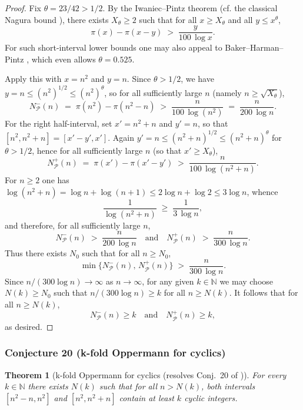 \documentclass[12pt]{article}
\newtheorem{theorem}{Theorem}
\theoremstyle{remark}
\begin{document}
\begin{proof}
Fix $\theta=23/42>1/2$. By the Iwaniec--Pintz theorem (cf. the classical Nagura bound \cite{Nagura1952}), there exists $X_\theta\ge 2$ such that for all $x\ge X_\theta$ and all $y\le x^{\theta}$,
\[
\pi(x)-\pi(x-y)\;>\;\frac{y}{100\,\log x}.
\]
For such short-interval lower bounds one may also appeal to Baker--Harman--Pintz \cite{BHP2001}, which even allows $\theta=0.525$.

Apply this with $x=n^2$ and $y=n$. Since $\theta>1/2$, we have $y=n\le (n^2)^{1/2}\le (n^2)^{\theta}$, so for all sufficiently large $n$ (namely $n\ge \sqrt{X_\theta}$),
\[
N^{-}_{\mathcal P}(n)
\;=\;\pi(n^2)-\pi(n^2-n)
\;>\;\frac{n}{100\,\log(n^2)}
\;=\;\frac{n}{200\,\log n}.
\]
For the right half-interval, set $x'=n^2+n$ and $y'=n$, so that $[n^2,n^2+n]=[x'-y',x']$. Again $y'=n\le (n^2+n)^{1/2}\le (n^2+n)^{\theta}$ for $\theta>1/2$, hence for all sufficiently large $n$ (so that $x'\ge X_\theta$),
\[
N^{+}_{\mathcal P}(n)
\;=\;\pi(x')-\pi(x'-y')
\;>\;\frac{n}{100\,\log(n^2+n)}.
\]
For $n\ge 2$ one has $\log(n^2+n)=\log n+\log(n+1)\le 2\log n+\log 2\le 3\log n$, whence
\[
\frac{1}{\log(n^2+n)}\;\ge\;\frac{1}{3\,\log n},
\]
and therefore, for all sufficiently large $n$,
\[
N^{-}_{\mathcal P}(n)\;>\;\frac{n}{200\,\log n}
\quad\text{and}\quad
N^{+}_{\mathcal P}(n)\;>\;\frac{n}{300\,\log n}.
\]
Thus there exists $N_0$ such that for all $n\ge N_0$,
\[
\min\bigl\{N^{-}_{\mathcal P}(n),\,N^{+}_{\mathcal P}(n)\bigr\}
\;>\;\frac{n}{300\,\log n}.
\]
Since $n/(300\log n)\to\infty$ as $n\to\infty$, for any given $k\in\mathbb{N}$ we may choose $N(k)\ge N_0$ such that $n/(300\log n)\ge k$ for all $n\ge N(k)$. It follows that for all $n\ge N(k)$,
\[
N^{-}_{\mathcal P}(n)\ge k\quad\text{and}\quad N^{+}_{\mathcal P}(n)\ge k,
\]
as desired.
\end{proof}


\subsubsection{Conjecture 20 (k-fold Oppermann for cyclics)}
\begin{theorem}[k-fold Oppermann for cyclics (resolves Conj.~20 of \cite{Cohen2025})]\label{thm:k_fold_oppermann_for_cyclics}
For every $k\in \mathbb{N}$ there exists $N(k)$ such that for all $n>N(k)$, both intervals $[n^2-n,n^2]$ and $[n^2,n^2+n]$ contain at least $k$ cyclic integers.
\end{theorem}
\end{document}
